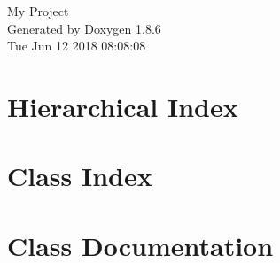 \documentclass[twoside]{book}
\newcommand{\clearemptydoublepage}{%
  \newpage{\pagestyle{empty}\cleardoublepage}%
}
\begin{document}
\hypersetup{pageanchor=false}
\begin{titlepage}
\vspace*{7cm}
\begin{center}%
{\Large My Project }\\
\vspace*{1cm}
{\large Generated by Doxygen 1.8.6}\\
\vspace*{0.5cm}
{\small Tue Jun 12 2018 08:08:08}\\
\end{center}
\end{titlepage}
\clearemptydoublepage
\tableofcontents
\clearemptydoublepage
{}
\hypersetup{pageanchor=true}

\chapter{Hierarchical Index}

\chapter{Class Index}

\chapter{Class Documentation}























































\newpage
{}
{}
\printindex
\end{document}
